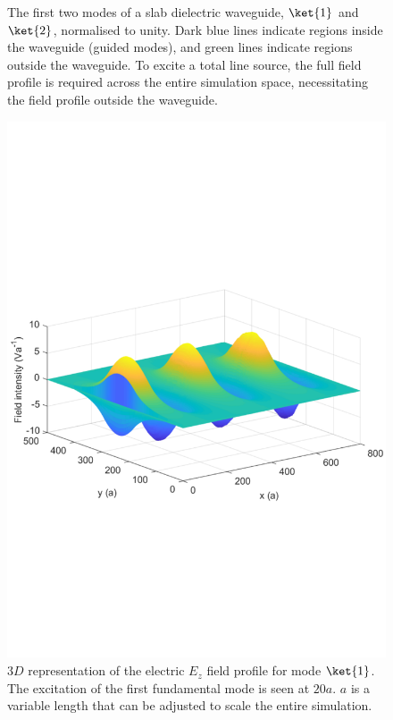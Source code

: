 \begin{figure}[t]
\centering
\setlength{\figH}{0.5\textwidth}
\setlength{\figW}{0.5\textwidth}
\begin{subfigure}[t]{0.5\textwidth}
	
\end{subfigure}%
\begin{subfigure}[t]{0.5\textwidth}
	
\end{subfigure}
\caption[First two TE modes of a slab dielectric]{The first two modes of a slab dielectric waveguide, $\ket{1}$ and $\ket{2}$, normalised to unity. Dark blue lines indicate regions inside the waveguide (guided modes), and green lines indicate regions outside the waveguide. To excite a total line source, the full field profile is required across the entire simulation space, necessitating the field profile outside the waveguide.}
\label{fig:modes}
\end{figure}


\begin{figure}[t]
	\centering
	\includegraphics[trim={0 7cm 0 7cm}, scale=0.6]{graphs/modes/untitled.pdf}
	\caption[First two TE modes of a slab dielectric]{$3D$ representation of the electric $E_z$ field profile for mode $\ket{1}$. The excitation of the first fundamental mode is seen at $20 a$. $a$ is a variable length that can be adjusted to scale the entire simulation.}
	\label{fig:3dmode}
\end{figure}


